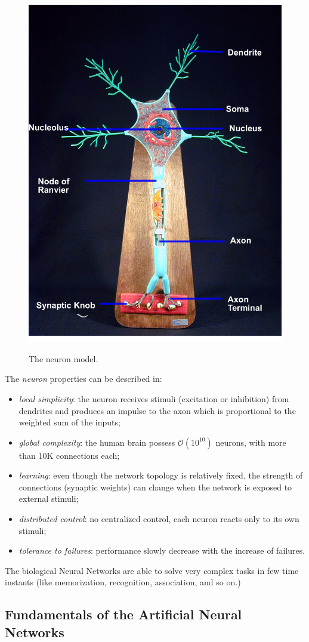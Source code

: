 \begin{figure}[t]
\centering
\caption{The neuron model.}
\includegraphics[width=0.4\linewidth]{img/neuron_model}
\label{fig:neuron}
\end{figure}

The \textit{neuron} properties can be described in:
\begin{itemize}
\item \textit{local simplicity}: the neuron receives stimuli (excitation or inhibition) from dendrites and produces an impulse to the axon which is proportional to the weighted sum of the inputs;
\item \textit{global complexity}: the human brain possess 
$\mathcal{O}(10^{10})$ 
neurons, with more than 10K connections each;
\item \textit{learning}: even though the network topology is relatively fixed, the strength of connections (synaptic weights) can change when the network is exposed to external stimuli;
\item \textit{distributed control}: no centralized control, each neuron reacts only to its own stimuli;
\item \textit{tolerance to failures}: performance slowly decrease with the increase of failures.
\end{itemize}

The biological Neural Networks are able to solve very complex tasks in few time instants (like memorization, recognition, association, and so on.)

\subsection{Fundamentals of the Artificial Neural Networks} 

